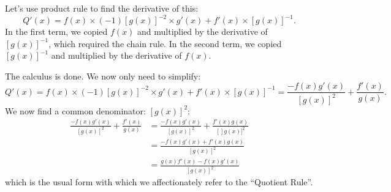 \documentclass{ximera}
\begin{document}
Let’s use product rule to find the derivative of this:   
\[
Q'(x) = f(x) \times (-1)[g(x)]^{-2} \times g'(x)+ f'(x)\times[g(x)]^{-1}.
\]
In the first term, we copied  $f(x)$ and multiplied by the derivative of  $[g(x)]^{-1}$, which required the chain rule.  In the second term, we copied  $[g(x)]^{-1}$ and multiplied by the derivative of  $f(x)$.


The calculus is done.  We now only need to simplify:
\[
Q'(x) = f(x) \times (-1)[g(x)]^{-2} \times g'(x)+ f'(x)\times[g(x)]^{-1} = \frac{-f(x)g'(x)}{[g(x)]^2} + \frac{f'(x)}{g(x)}.
\]
We now find a common denominator:  $[g(x)]^2$:   
\begin{align*}
\frac{-f(x)g'(x)}{[g(x)]^2} + \frac{f'(x)}{g(x)} &= \frac{-f(x)g'(x)}{[g(x)]^2} + \frac{f'(x)g(x)}{[]g(x)]^2}\\
&= \frac{-f(x)g'(x) + f'(x) g(x)}{[g(x)]^2} \\
&= \frac{g(x) f'(x) - f(x) g'(x)}{[g(x)]^2}
\end{align*}
which is the usual form with which we affectionately refer to the ``Quotient Rule''.
\end{document}
